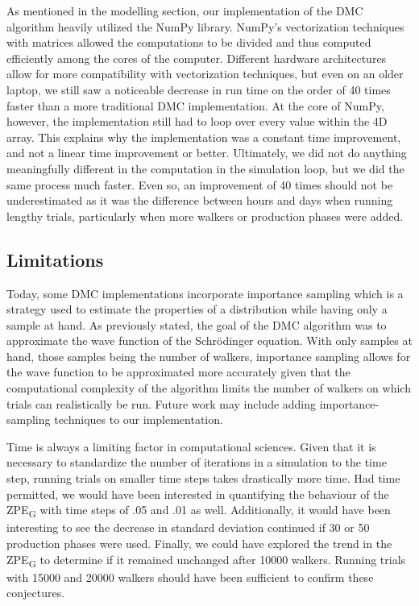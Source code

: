 \documentclass[journal=jacsat,manuscript=article]{achemso}
\begin{document}
As mentioned in the modelling section, our implementation of the DMC algorithm heavily utilized the NumPy library. NumPy’s vectorization techniques with matrices allowed the computations to be divided and thus computed efficiently among the cores of the computer. Different hardware architectures allow for more compatibility with vectorization techniques, but even on an older laptop, we still saw a noticeable decrease in run time on the order of 40 times faster than a more traditional DMC implementation. At the core of NumPy, however, the implementation still had to loop over every value within the 4D array. This explains why the implementation was a constant time improvement, and not a linear time improvement or better. Ultimately, we did not do anything meaningfully different in the computation in the simulation loop, but we did the same process much faster. Even so, an improvement of 40 times should not be underestimated as it was the difference between hours and days when running lengthy trials, particularly when more walkers or production phases were added.

\subsection{Limitations}

Today, some DMC implementations incorporate importance sampling\cite{Vihola2020} which is a strategy used to estimate the properties of a distribution while having only a sample at hand. As previously stated, the goal of the DMC algorithm was to approximate the wave function of the Schr\"odinger equation. With only samples at hand, those samples being the number of walkers, importance sampling allows for the wave function to be approximated more accurately\cite{Bulik2018} given that the computational complexity of the algorithm limits the number of walkers on which trials can realistically be run. Future work may include adding importance-sampling techniques to our implementation. 

Time is always a limiting factor in computational sciences. Given that it is necessary to standardize the number of iterations in a simulation to the time step, running trials on smaller time steps takes drastically more time. Had time permitted, we would have been interested in quantifying the behaviour of the ZPE\textsubscript{G} with time steps of .05 and .01 as well. Additionally, it would have been interesting to see the decrease in standard deviation continued if 30 or 50 production phases were used. Finally, we could have explored the trend in the ZPE\textsubscript{G} to determine if it remained unchanged after 10000 walkers. Running trials with 15000 and 20000 walkers should have been sufficient to confirm these conjectures.
\end{document}
